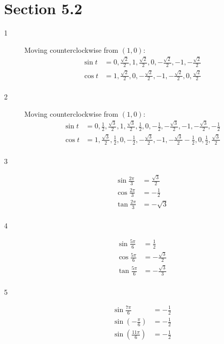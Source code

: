 \documentclass{exam}
\begin{document}
    \section{Section 5.2}
    \begin{description}

      \item[1]
        Moving counterclockwise from $(1, 0)$:
        \begin{align*}
          \sin t &= 0, \frac{\sqrt{2}}{2}, 1, \frac{\sqrt{2}}{2}, 0, - \frac{\sqrt{2}}{2}, -1, - \frac{\sqrt{2}}{2} \\
          \cos t &= 1, \frac{\sqrt{2}}{2}, 0, - \frac{\sqrt{2}}{2}, -1, - \frac{\sqrt{2}}{2}, 0, \frac{\sqrt{2}}{2} \\
        \end{align*}

      \item[2]
        Moving counterclockwise from $(1, 0)$:
        \begin{align*}
          \sin t &= 0, \frac{1}{2}, \frac{\sqrt{3}}{2}, 1, \frac{\sqrt{3}}{2}, \frac{1}{2}, 0, -\frac{1}{2},
            -\frac{\sqrt{3}}{2}, -1, - \frac{\sqrt{3}}{2}, - \frac{1}{2} \\
          \cos t &= 1, \frac{\sqrt{3}}{2}, \frac{1}{2}, 0, - \frac{1}{2}, - \frac{\sqrt{3}}{2}, -1, - \frac{\sqrt{3}}{2}
              -\frac{1}{2}, 0, \frac{1}{2}, \frac{\sqrt{3}}{2} \\
        \end{align*}

      \item[3]
        \begin{align*}
          \sin \frac{2 \pi}{3} &= \frac{\sqrt{3}}{2} \\
          \cos \frac{2 \pi}{3} &= - \frac{1}{2} \\
          \tan \frac{2 \pi}{3} &= - \sqrt{3} \\
        \end{align*}

      \item[4]
        \begin{align*}
          \sin \frac{5 \pi}{6} &= \frac{1}{2} \\
          \cos \frac{5 \pi}{6} &= - \frac{\sqrt{3}}{2} \\
          \tan \frac{5 \pi}{6} &= - \frac{\sqrt{3}}{3} \\
        \end{align*}

      \item[5]
        \begin{align*}
          \sin \frac{7 \pi}{6}                 &= - \frac{1}{2} \\
          \sin \left( - \frac{\pi}{6} \right)  &= - \frac{1}{2} \\
          \sin \left( \frac{11 \pi}{6} \right) &= - \frac{1}{2} \\
        \end{align*}


\end{description}
\end{document}
